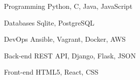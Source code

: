 

\begin{cvskills}

  \cvskill
    {Programming} %
    {Python, C, Java, JavaScript} %

  \cvskill
    {Databases} %
    {Sqlite, PostgreSQL} %

  \cvskill
    {DevOps} %
    {Ansible, Vagrant, Docker, AWS} %

  \cvskill
    {Back-end} %
    {REST API, Django, Flask, JSON} %

  \cvskill
    {Front-end} %
    {HTML5, React, CSS} %


\end{cvskills}
